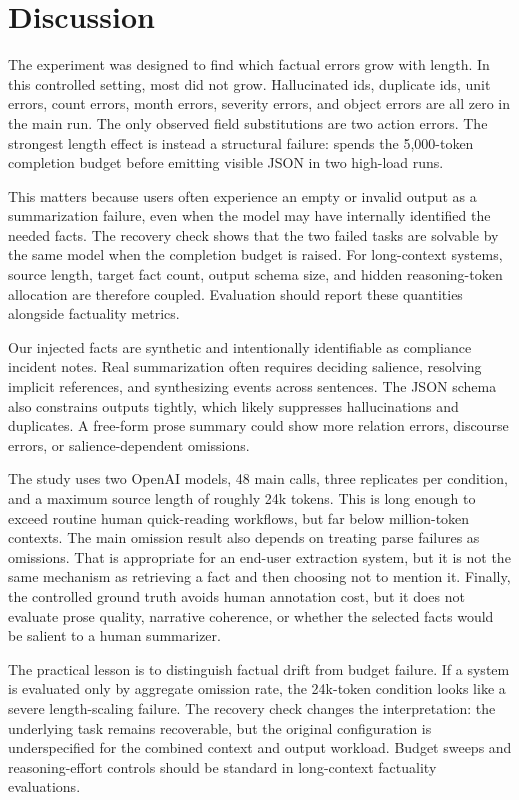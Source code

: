 \section{Discussion}
\label{sec:discussion}

The experiment was designed to find which factual errors grow with length. In this controlled setting, most did not grow. Hallucinated ids, duplicate ids, unit errors, count errors, month errors, severity errors, and object errors are all zero in the main run. The only observed field substitutions are two action errors. The strongest length effect is instead a structural failure: \gptfivemini spends the 5,000-token completion budget before emitting visible JSON in two high-load runs.

This matters because users often experience an empty or invalid output as a summarization failure, even when the model may have internally identified the needed facts. The recovery check shows that the two failed tasks are solvable by the same model when the completion budget is raised. For long-context systems, source length, target fact count, output schema size, and hidden reasoning-token allocation are therefore coupled. Evaluation should report these quantities alongside factuality metrics.

Our injected facts are synthetic and intentionally identifiable as compliance incident notes. Real summarization often requires deciding salience, resolving implicit references, and synthesizing events across sentences. The JSON schema also constrains outputs tightly, which likely suppresses hallucinations and duplicates. A free-form prose summary could show more relation errors, discourse errors, or salience-dependent omissions.

The study uses two OpenAI models, 48 main calls, three replicates per condition, and a maximum source length of roughly 24k tokens. This is long enough to exceed routine human quick-reading workflows, but far below million-token contexts. The main omission result also depends on treating parse failures as omissions. That is appropriate for an end-user extraction system, but it is not the same mechanism as retrieving a fact and then choosing not to mention it. Finally, the controlled ground truth avoids human annotation cost, but it does not evaluate prose quality, narrative coherence, or whether the selected facts would be salient to a human summarizer.

The practical lesson is to distinguish factual drift from budget failure. If a system is evaluated only by aggregate omission rate, the 24k-token \gptfivemini condition looks like a severe length-scaling failure. The recovery check changes the interpretation: the underlying task remains recoverable, but the original configuration is underspecified for the combined context and output workload. Budget sweeps and reasoning-effort controls should be standard in long-context factuality evaluations.
